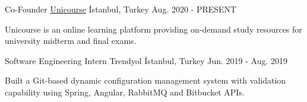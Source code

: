 
\vspace*{-1.5mm}
\begin{cventries}

  \cventry
    {Co-Founder}
    {\href{https://unicourse.co}{Unicourse}}
    {İstanbul, Turkey}
    {Aug. 2020 - PRESENT}
    {
      \begin{cvitems}
        \item {Unicourse is an online learning platform providing on-demand study resources for university midterm and final exams.}
      \end{cvitems}
    }

  \cventry
    {Software Engineering Intern}
    {Trendyol}
    {İstanbul, Turkey}
    {Jun. 2019 - Aug. 2019}
    {
      \begin{cvitems}
        \item {Built a Git-based dynamic configuration management system with validation capability using Spring, Angular, RabbitMQ and Bitbucket APIs.}
      \end{cvitems}
    }
\end{cventries}
